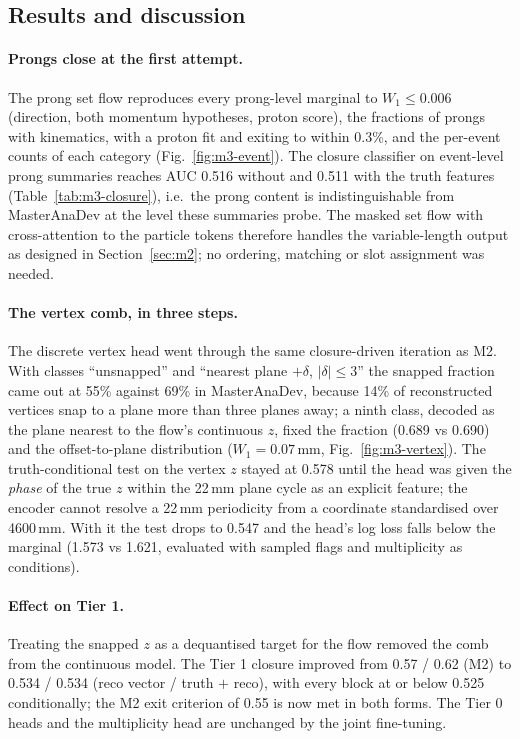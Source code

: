 
\subsection{Results and discussion}

\paragraph{Prongs close at the first attempt.} The prong set flow reproduces every prong-level marginal to
$W_1 \le 0.006$ (direction, both momentum hypotheses, proton score), the fractions of prongs with
kinematics, with a proton fit and exiting to within 0.3\%, and the per-event counts of each category
(Fig.~\ref{fig:m3-event}). The closure classifier on event-level prong summaries reaches AUC 0.516 without
and 0.511 with the truth features (Table~\ref{tab:m3-closure}), i.e.\ the prong content is
indistinguishable from MasterAnaDev at the level these summaries probe. The masked set flow with
cross-attention to the particle tokens therefore handles the variable-length output as designed in
Section~\ref{sec:m2}; no ordering, matching or slot assignment was needed.

\paragraph{The vertex comb, in three steps.} The discrete vertex head went through the same closure-driven
iteration as M2. With classes ``unsnapped'' and ``nearest plane $+\delta$, $|\delta|\le 3$'' the snapped fraction
came out at 55\% against 69\% in MasterAnaDev, because 14\% of reconstructed vertices snap to a plane more
than three planes away; a ninth class, decoded as the plane nearest to the flow's continuous $z$, fixed the
fraction (0.689 vs 0.690) and the offset-to-plane distribution ($W_1 = 0.07$\,mm,
Fig.~\ref{fig:m3-vertex}). The truth-conditional test on the vertex $z$ stayed at 0.578 until the head was given the
\emph{phase} of the true $z$ within the 22\,mm plane cycle as an explicit feature; the encoder cannot resolve a
22\,mm periodicity from a coordinate standardised over 4600\,mm. With it the test drops to 0.547 and the
head's log loss falls below the marginal (1.573 vs 1.621, evaluated with sampled flags and
multiplicity as conditions).

\paragraph{Effect on Tier 1.} Treating the snapped $z$ as a dequantised target for the flow removed the comb
from the continuous model. The Tier 1 closure improved from 0.57 / 0.62 (M2) to
0.534 / 0.534 (reco vector / truth $+$ reco), with every block at or below 0.525
conditionally; the M2 exit criterion of 0.55 is now met in both forms. The Tier 0 heads and the multiplicity
head are unchanged by the joint fine-tuning.

